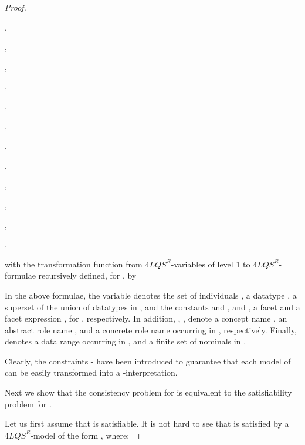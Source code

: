 \documentclass[a4paper]{llncs}
\newcommand{\flqsr}{\ensuremath{4LQS^R}}
\begin{document}
\begin{proof}
\begin{itemize}{\small
\item[-] 

,

\item[-] ,

\item[-] ,

\item[-] 

,

\item[-] ,

\item[-] ,

\item[-] ,

\item[-] 

,

\item[-] 

,

\item[-] ,

\item[-] 

,

\item[-] ,
}


with  the transformation function from \flqsr-variables of level 1 to \flqsr-formulae recursively defined, for , by



\end{itemize}


\noindent In the above formulae, the variable  denotes the set of individuals ,  a datatype ,   a superset of the union of datatypes in ,  and  the constants  and , and ,  a facet  and a facet expression , for , respectively. In addition, , ,  denote a concept name , an abstract role name , and a concrete role name  occurring in , respectively. Finally,  denotes a data range  occurring in , and  a finite set  of nominals in .

Clearly, the constraints - have been introduced to guarantee that each model of  can be easily transformed into a -interpretation.

Next we show that the consistency problem for  is equivalent to the satisfiability problem for .

Let us first assume that  is satisfiable. It is not hard to see that  is satisfied by a \flqsr-model of the form , where:


\end{proof}
\end{document}
